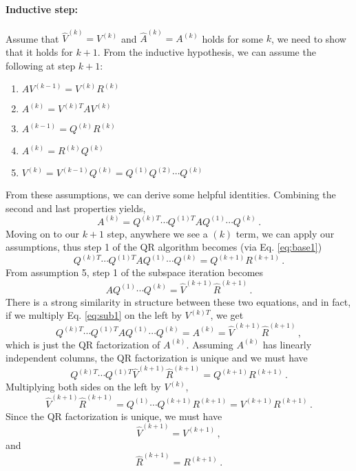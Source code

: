 \documentclass[letterpaper,10pt]{article}
\begin{document}
\paragraph*{Inductive step:} Assume that $\hat
V^{(k)}=V^{(k)}$ and $\hat A^{(k)}=A^{(k)}$ holds for some $k$, we need to show
that it holds for $k+1$. From the inductive hypothesis, we can assume the
following at step $k+1$:
\begin{enumerate}
\item $AV^{(k-1)}=V^{(k)}R^{(k)}$
\item $A^{(k)}=V^{(k)T}AV^{(k)}$
\item $A^{(k-1)}=Q^{(k)}R^{(k)}$
\item $A^{(k)}=R^{(k)}Q^{(k)}$
\item $V^{(k)}=V^{(k-1)}Q^{(k)}=Q^{(1)}Q^{(2)}\cdots Q^{(k)}$
\end{enumerate}
From these assumptions, we can derive some helpful identities. Combining the
second and last properties yields,
\begin{equation}\label{eq:base1}
A^{(k)}=Q^{(k)T}\cdots Q^{(1)T}AQ^{(1)}\cdots Q^{(k)}\,.
\end{equation}
Moving on to our $k+1$ step, anywhere we see a $(k)$ term, we can apply our
assumptions, thus step 1 of the QR algorithm becomes (via Eq. \ref{eq:base1})
\begin{equation}
Q^{(k)T}\cdots Q^{(1)T}AQ^{(1)}\cdots Q^{(k)}=Q^{(k+1)}R^{(k+1)}\,.
\end{equation}
From assumption 5, step 1 of the subspace iteration becomes
\begin{equation}\label{eq:sub1}
AQ^{(1)}\cdots Q^{(k)}=\hat V^{(k+1)}\hat R^{(k+1)}\,.
\end{equation}
There is a strong similarity in structure between these two equations, and in
fact, if we multiply Eq. \ref{eq:sub1} on the left by $V^{(k)T}$, we get
\begin{equation}
Q^{(k)T}\cdots Q^{(1)T}AQ^{(1)}\cdots Q^{(k)}=A^{(k)}
=\hat V^{(k+1)}\hat R^{(k+1)}\,,
\end{equation}
which is just the QR factorization of $A^{(k)}$. Assuming $A^{(k)}$ has
linearly independent columns, the QR factorization is unique and we must have
\[
Q^{(k)T}\cdots Q^{(1)T}\hat V^{(k+1)}\hat R^{(k+1)}=Q^{(k+1)}R^{(k+1)}\,.
\]
Multiplying both sides on the left by $V^{(k)}$,
\[
\hat V^{(k+1)}\hat R^{(k+1)}=Q^{(1)}\cdots Q^{(k+1)}R^{(k+1)}
=V^{(k+1)}R^{(k+1)}\,.
\]
Since the QR factorization is unique, we must have
\[
\hat V^{(k+1)}=V^{(k+1)}\,,
\]
and
\[
\hat R^{(k+1)}=R^{(k+1)}\,.
\]
\end{document}
